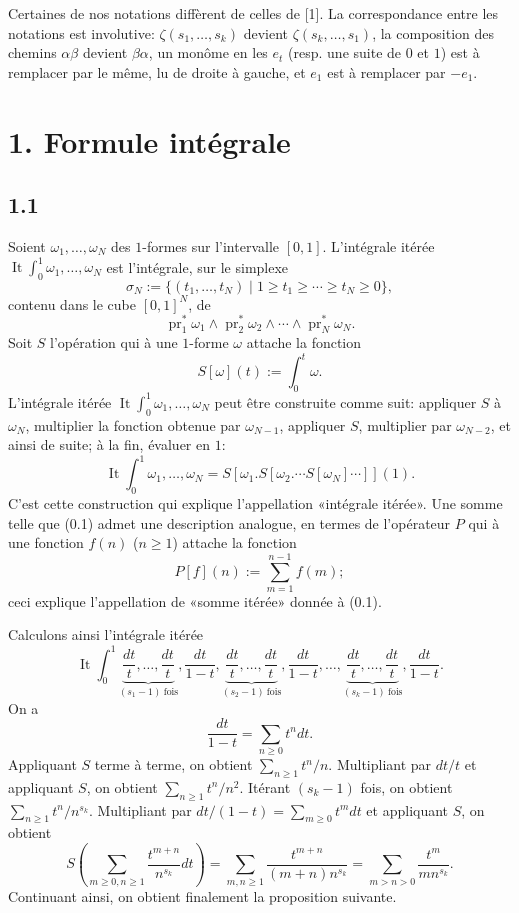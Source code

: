 \documentclass[10pt]{article}
\newcommand{\It}{\operatorname{It}}
\begin{document}
Certaines de nos notations diffèrent de celles de [1]. La correspondance entre les notations est involutive: $\zeta(s_1,\ldots,s_k)$ devient $\zeta(s_k,\ldots,s_1)$, la composition des chemins $\alpha\beta$ devient $\beta\alpha$, un monôme en les $e_t$ (resp. une suite de $0$ et $1$) est à remplacer par le même, lu de droite à gauche, et $e_1$ est à remplacer par $-e_1$.

\section*{1. Formule intégrale}
\subsection*{1.1}
Soient $\omega_1,\ldots,\omega_N$ des $1$-formes sur l'intervalle $[0,1]$. L'intégrale itérée $\It\int_0^1\omega_1,\ldots,\omega_N$ est l'intégrale, sur le simplexe
\begin{equation}
\sigma_N:=\{(t_1,\ldots,t_N)\mid 1\geq t_1\geq\cdots\geq t_N\geq0\},
\tag{1.1.1}
\end{equation}
contenu dans le cube $[0,1]^N$, de
\[
\operatorname{pr}_1^*\omega_1\wedge\operatorname{pr}_2^*\omega_2\wedge\cdots\wedge\operatorname{pr}_N^*\omega_N.
\]
Soit $S$ l'opération qui à une $1$-forme $\omega$ attache la fonction
\[
 S[\omega](t):=\int_0^t\omega.
\]
L'intégrale itérée $\It\int_0^1\omega_1,\ldots,\omega_N$ peut être construite comme suit: appliquer $S$ à $\omega_N$, multiplier la fonction obtenue par $\omega_{N-1}$, appliquer $S$, multiplier par $\omega_{N-2}$, et ainsi de suite; à la fin, évaluer en $1$:
\begin{equation}
\It\int_0^1\omega_1,\ldots,\omega_N
=S[\omega_1.S[\omega_2.\cdots S[\omega_N]\cdots]](1).
\tag{1.1.2}
\end{equation}
C'est cette construction qui explique l'appellation «intégrale itérée». Une somme telle que (0.1) admet une description analogue, en termes de l'opérateur $P$ qui à une fonction $f(n)$ ($n\geq1$) attache la fonction
\[
 P[f](n):=\sum_{m=1}^{n-1}f(m);
\]
ceci explique l'appellation de «somme itérée» donnée à (0.1).

Calculons ainsi l'intégrale itérée
\begin{equation}
\It\int_0^1
\underbrace{\frac{dt}{t},\ldots,\frac{dt}{t}}_{(s_1-1)\ \mathrm{fois}},
\frac{dt}{1-t},
\underbrace{\frac{dt}{t},\ldots,\frac{dt}{t}}_{(s_2-1)\ \mathrm{fois}},
\frac{dt}{1-t},\ldots,
\underbrace{\frac{dt}{t},\ldots,\frac{dt}{t}}_{(s_k-1)\ \mathrm{fois}},
\frac{dt}{1-t}.
\tag{1.1.3}
\end{equation}
On a
\[
 \frac{dt}{1-t}=\sum_{n\geq0}t^n dt.
\]
Appliquant $S$ terme à terme, on obtient $\sum_{n\geq1}t^n/n$. Multipliant par $dt/t$ et appliquant $S$, on obtient $\sum_{n\geq1}t^n/n^2$. Itérant $(s_k-1)$ fois, on obtient $\sum_{n\geq1}t^n/n^{s_k}$. Multipliant par $dt/(1-t)=\sum_{m\geq0}t^m dt$ et appliquant $S$, on obtient
\[
S\left(\sum_{m\geq0,n\geq1}\frac{t^{m+n}}{n^{s_k}}dt\right)
=\sum_{m,n\geq1}\frac{t^{m+n}}{(m+n)n^{s_k}}
=\sum_{m>n>0}\frac{t^m}{mn^{s_k}}.
\]
Continuant ainsi, on obtient finalement la proposition suivante.
\end{document}
